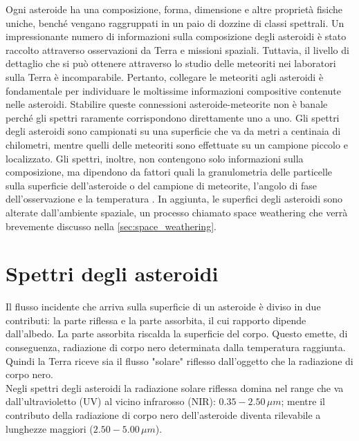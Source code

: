 \documentclass[a4paper,11pt,openright]{book}
\begin{document}
Ogni asteroide ha una composizione, forma, dimensione e altre proprietà fisiche uniche, benché vengano raggruppati in un paio di dozzine di classi spettrali. Un impressionante numero di informazioni sulla composizione degli asteroidi è stato raccolto attraverso osservazioni da Terra e missioni spaziali. Tuttavia, il livello di dettaglio che si può ottenere attraverso lo studio delle meteoriti nei laboratori sulla Terra è incomparabile. Pertanto, collegare le meteoriti agli asteroidi è fondamentale per individuare le moltissime informazioni compositive contenute nelle asteroidi. Stabilire queste connessioni asteroide-meteorite non è banale perché gli spettri raramente corrispondono direttamente uno a uno. Gli spettri degli asteroidi sono campionati su una superficie che va da metri a centinaia di chilometri, mentre quelli delle meteoriti sono effettuate su un campione piccolo e localizzato. Gli spettri, inoltre, non contengono solo informazioni sulla composizione, ma dipendono da fattori quali la granulometria delle particelle sulla superficie dell'asteroide o del campione di meteorite, l'angolo di fase dell'osservazione e la temperatura \citep{demeo_connecting_2022}. In aggiunta, le superfici degli asteroidi sono alterate dall'ambiente spaziale, un processo chiamato space weathering che verrà brevemente discusso nella \cref{sec:space_weathering}.



\section{Spettri degli asteroidi}
Il flusso incidente che arriva sulla superficie di un asteroide è diviso in due contributi: la parte riflessa e la parte assorbita, il cui rapporto dipende dall'albedo. La parte assorbita riscalda la superficie del corpo. Questo emette, di conseguenza, radiazione di corpo nero determinata dalla temperatura raggiunta. Quindi la Terra riceve sia il flusso "solare" riflesso dall'oggetto che la radiazione di corpo nero.\\
Negli spettri degli asteroidi la radiazione solare riflessa domina nel range che va dall'ultravioletto (UV) al vicino infrarosso (NIR): $0.35-2.50\,\mu m$; mentre il contributo della radiazione di corpo nero dell'asteroide diventa rilevabile a lunghezze maggiori ($2.50-5.00\,\mu m$).
\end{document}
